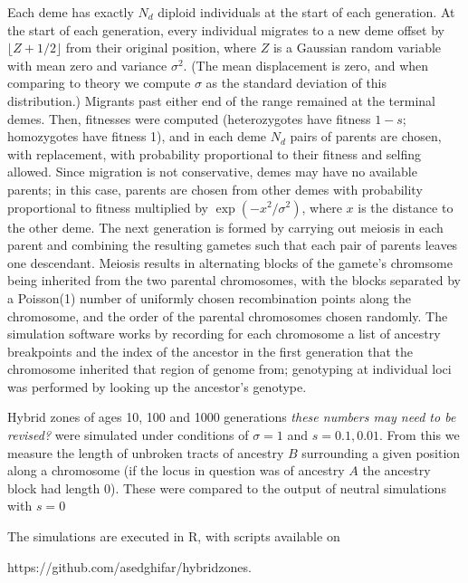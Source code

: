\documentclass[12pt]{article}
\newcommand{\alisa}[1]{{\em \color{red} #1}}
\begin{document}
Each deme has exactly $N_d$ diploid individuals at the start of each generation.
At the start of each generation, every individual migrates to a new deme  offset by $\lfloor Z + 1/2 \rfloor$ from their original position,
where $Z$ is a Gaussian random variable with mean zero and variance $\sigma^2$.
(The mean displacement is zero, and when comparing to theory we compute $\sigma$ as the standard deviation of this distribution.)
Migrants past either end of the range remained at the terminal demes.
Then, 
fitnesses were computed (heterozygotes have fitness $1-s$; homozygotes have fitness 1),
and in each deme $N_d$ pairs of parents are chosen, with replacement,
with probability proportional to their fitness and selfing allowed.
Since migration is not conservative, demes may have no available parents;
in this case, parents are chosen from other demes with probability proportional to fitness
multiplied by $\exp(-x^2/\sigma^2)$, where $x$ is the distance to the other deme.
The next generation is formed by carrying out meiosis in each parent
and combining the resulting gametes such that each pair of parents leaves one descendant.
Meiosis results in alternating blocks of the gamete's chromsome
being inherited from the two parental chromosomes,
with the blocks separated by a Poisson(1) number of uniformly chosen recombination points along the chromosome,
and the order of the parental chromosomes chosen randomly.
The simulation software works by recording for each chromosome
a list of ancestry breakpoints and the index of the ancestor in the first generation
that the chromosome inherited that region of genome from;
genotyping at individual loci was performed by looking up the ancestor's genotype.

Hybrid zones of ages 10, 100 and 1000 generations \alisa{these numbers may need to be revised?} were simulated under conditions of $\sigma=1$ and $s=0.1,0.01$. From this we measure the length of unbroken tracts of ancestry $B$ surrounding a given position along a chromosome (if the locus in question was of ancestry $A$ the ancestry block had length $0$). These were compared to the output of neutral simulations with $s=0$

The simulations are executed in R, with scripts available on

 https://github.com/asedghifar/hybridzones.
\end{document}
